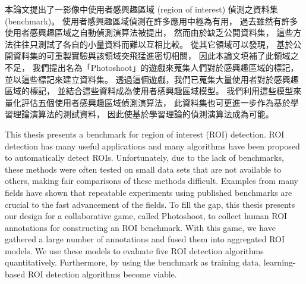 \begin{abstractzh}
本論文提出了一影像中使用者感興趣區域 (region of interest)
偵測之資料集 (benchmark)。
使用者感興趣區域偵測在許多應用中極為有用，
過去雖然有許多使用者感興趣區域之自動偵測演算法被提出，
然而由於缺乏公開資料集，
這些方法往往只測試了各自的小量資料而難以互相比較。
從其它領域可以發現，
基於公開資料集的可重製實驗與該領域突飛猛進密切相關，
因此本論文填補了此領域之不足，
我們提出名為「Photoshoot」的遊戲來蒐集人們對於感興趣區域的標記，
並以這些標記來建立資料集。
透過這個遊戲，我們已蒐集大量使用者對於感興趣區域的標記，
並結合這些資料成為使用者感興趣區域模型。
我們利用這些模型來量化評估五個使用者感興趣區域偵測演算法，
此資料集也可更進一步作為基於學習理論演算法的測試資料，
因此使基於學習理論的偵測演算法成為可能。

\end{abstractzh}

\begin{abstracten}
This thesis presents a benchmark for region of interest (ROI)
detection. ROI detection has many useful applications and many
algorithms have been proposed to automatically detect ROIs.
Unfortunately, due to the lack of benchmarks, these methods were
often tested on small data sets that are not available to others,
making fair comparisons of these methods difficult. Examples from
many fields have shown that repeatable experiments using published
benchmarks are crucial to the fast advancement of the fields. To
fill the gap, this thesis presents our design for a collaborative
game, called Photoshoot, to collect human ROI annotations for
constructing an ROI benchmark. With this game, we have gathered a
large number of annotations and fused them into aggregated ROI
models. We use these models to evaluate five ROI detection
algorithms quantitatively. Furthermore, by using the benchmark as
training data, learning-based ROI detection algorithms become
viable.

\end{abstracten}

\begin{comment}
\category{I2.10}{Computing Methodologies}{Artificial Intelligence --
Vision and Scene Understanding} \category{H5.3}{Information
Systems}{Information Interfaces and Presentation (HCI) -- Web-based
Interaction.}

\terms{Design, Human factors, Performance.}

\keywords{Region of interest, Visual attention model, Web-based
games, Benchmarks.}
\end{comment}
